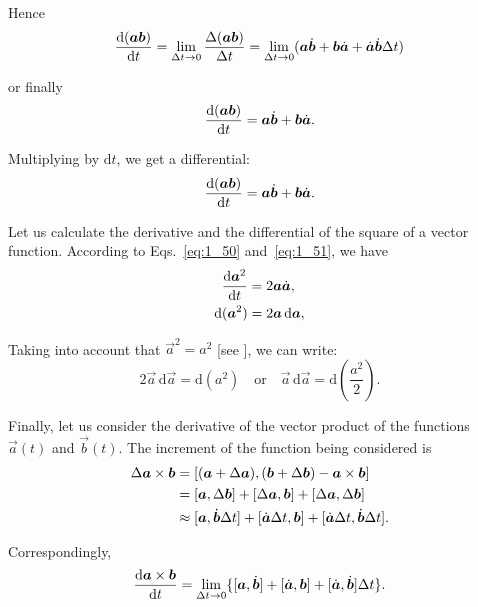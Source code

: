 \noindent
Hence
\begin{equation*}
\frac{\mathrm{d}(\boldsymbol{a}\boldsymbol{b})}{\mathrm{d} t} = \lim_{\Delta t\to 0} \frac{\Delta(\boldsymbol{a}\boldsymbol{b})}{\Delta t} = \lim_{\Delta t\to 0} (\boldsymbol{a}\dot{\boldsymbol{b}} + \boldsymbol{b}\dot{\boldsymbol{a}} + \dot{\boldsymbol{a}}\dot{\boldsymbol{b}}\Delta t)
\end{equation*}

\noindent
or finally
\begin{equation}\label{eq:1_50}
\frac{\mathrm{d}(\boldsymbol{a}\boldsymbol{b})}{\mathrm{d} t} = \boldsymbol{a}\dot{\boldsymbol{b}} + \boldsymbol{b}\dot{\boldsymbol{a}}.
\end{equation}

\noindent
Multiplying  by $\mathrm{d}t$, we get a differential:
\begin{equation}\label{eq:1_51}
\frac{\mathrm{d}(\boldsymbol{a}\boldsymbol{b})}{\mathrm{d} t} = \boldsymbol{a}\dot{\boldsymbol{b}} + \boldsymbol{b}\dot{\boldsymbol{a}}.
\end{equation}

Let us calculate the derivative and the differential of the square of a vector function. According to Eqs.~\eqref{eq:1_50} and~\eqref{eq:1_51}, we have
\begin{align}
\frac{\mathrm{d}\boldsymbol{a}^2}{\mathrm{d} t} &= 2\boldsymbol{a}\dot{\boldsymbol{a}},\label{eq:1_52}\\
\mathrm{d}(\boldsymbol{a}^2) &= 2\boldsymbol{a}\,\mathrm{d}\boldsymbol{a},\label{eq:1_53}
\end{align}

\noindent
Taking into account that $\vec{a}^2 = a^2$ [see ], we can write:
\begin{equation}\label{eq:1_54}
2\vec{a}\,\mathrm{d}\vec{a} = \mathrm{d}(a^2) \quad \text{or} \quad \vec{a}\,\mathrm{d}\vec{a} = \mathrm{d}\left(\frac{a^2}{2}\right).
\end{equation}

Finally, let us consider the derivative of the vector product of the functions $\vec{a}(t)$ and $\vec{b}(t)$. The increment of the function being considered is
\begin{align*}
\Delta\boldsymbol{a}\times\boldsymbol{b} &= [(\boldsymbol{a} + \Delta\boldsymbol{a}),(\boldsymbol{b} + \Delta\boldsymbol{b}) - \boldsymbol{a}\times\boldsymbol{b}]\\
&= [\boldsymbol{a},\Delta\boldsymbol{b}] + [\Delta\boldsymbol{a},\boldsymbol{b}] + [\Delta\boldsymbol{a},\Delta\boldsymbol{b}]\\
&\approx [\boldsymbol{a},\dot{\boldsymbol{b}}\Delta t] + [\dot{\boldsymbol{a}}\Delta t,\boldsymbol{b}] + [\dot{\boldsymbol{a}}\Delta t,\dot{\boldsymbol{b}}\Delta t].
\end{align*}

\noindent
Correspondingly,
\begin{equation*}
\frac{\mathrm{d}\boldsymbol{a}\times\boldsymbol{b}}{\mathrm{d} t} = \lim_{\Delta t\to 0} \{[\boldsymbol{a},\dot{\boldsymbol{b}}] + [\dot{\boldsymbol{a}},\boldsymbol{b}] + [\dot{\boldsymbol{a}},\dot{\boldsymbol{b}}]\Delta t\}.
\end{equation*}

